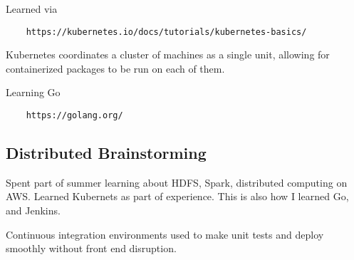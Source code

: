 \documentclass[11pt]{article}
\theoremstyle{remark}
\begin{document}
Learned via

\begin{verbatim}
	https://kubernetes.io/docs/tutorials/kubernetes-basics/
\end{verbatim}

Kubernetes coordinates a cluster of machines as a single unit, allowing for containerized packages to be run on each of them.

Learning Go

\begin{verbatim}
	https://golang.org/
\end{verbatim}

\subsection{Distributed Brainstorming}

Spent part of summer learning about HDFS, Spark, distributed computing on AWS. Learned Kubernets as part of experience. This is also how I learned Go, and Jenkins. 

Continuous integration environments used to make unit tests and deploy smoothly without front end disruption.
\end{document}
